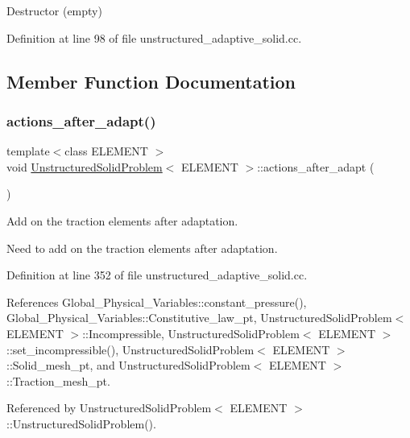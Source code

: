Destructor (empty) 



Definition at line 98 of file unstructured\+\_\+adaptive\+\_\+solid.\+cc.



\subsection{Member Function Documentation}
\mbox{\label{classUnstructuredSolidProblem_acf0bbf57534a1516a633d702d9fd21ab}} 
\subsubsection{\texorpdfstring{actions\+\_\+after\+\_\+adapt()}{actions\_after\_adapt()}}
{\footnotesize\ttfamily template$<$class E\+L\+E\+M\+E\+NT $>$ \\
void \hyperlink{classUnstructuredSolidProblem}{Unstructured\+Solid\+Problem}$<$ E\+L\+E\+M\+E\+NT $>$\+::actions\+\_\+after\+\_\+adapt (\begin{DoxyParamCaption}{ }\end{DoxyParamCaption})}



Add on the traction elements after adaptation. 

Need to add on the traction elements after adaptation. 

Definition at line 352 of file unstructured\+\_\+adaptive\+\_\+solid.\+cc.



References Global\+\_\+\+Physical\+\_\+\+Variables\+::constant\+\_\+pressure(), Global\+\_\+\+Physical\+\_\+\+Variables\+::\+Constitutive\+\_\+law\+\_\+pt, Unstructured\+Solid\+Problem$<$ E\+L\+E\+M\+E\+N\+T $>$\+::\+Incompressible, Unstructured\+Solid\+Problem$<$ E\+L\+E\+M\+E\+N\+T $>$\+::set\+\_\+incompressible(), Unstructured\+Solid\+Problem$<$ E\+L\+E\+M\+E\+N\+T $>$\+::\+Solid\+\_\+mesh\+\_\+pt, and Unstructured\+Solid\+Problem$<$ E\+L\+E\+M\+E\+N\+T $>$\+::\+Traction\+\_\+mesh\+\_\+pt.



Referenced by Unstructured\+Solid\+Problem$<$ E\+L\+E\+M\+E\+N\+T $>$\+::\+Unstructured\+Solid\+Problem().

